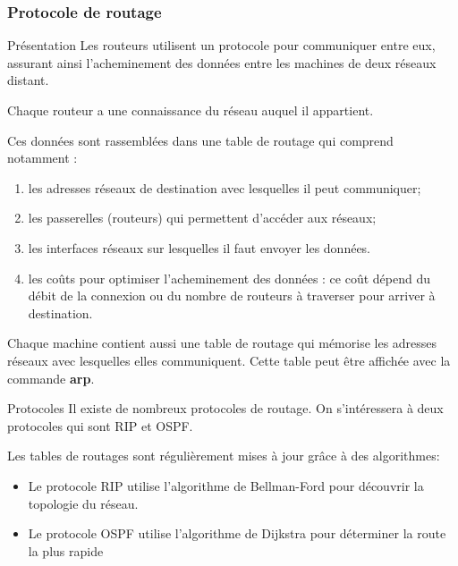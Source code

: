 \documentclass[8pt]{beamer}
\begin{document}
\begin{frame}
\frametitle{Protocole de routage}


\begin{block}{Présentation}
Les routeurs utilisent un protocole pour communiquer entre eux, assurant ainsi l'acheminement des données entre les machines de deux réseaux distant.

Chaque routeur a une connaissance du réseau auquel il appartient. 

Ces données sont rassemblées dans une table de routage qui comprend notamment :
\begin{enumerate}
\item les adresses réseaux de destination avec lesquelles il peut communiquer;
\item les passerelles (routeurs) qui permettent d'accéder aux réseaux;
\item les interfaces réseaux sur lesquelles il faut envoyer les données.
\item les coûts pour optimiser l'acheminement des données : ce coût dépend du débit de la connexion ou du nombre de routeurs à traverser pour arriver à destination.
\end{enumerate}

Chaque machine contient aussi une table de routage qui mémorise les adresses réseaux avec lesquelles elles communiquent. Cette table peut être affichée avec la commande \textbf{arp}.
\end{block}

\begin{block}{Protocoles}
Il existe de nombreux protocoles de routage. On s'intéressera à deux protocoles qui sont RIP et OSPF.\smallskip

Les tables de routages sont régulièrement mises à jour grâce à des algorithmes:
\begin{itemize}
\item Le protocole RIP utilise l'algorithme de Bellman-Ford pour découvrir la topologie du réseau.
\item Le protocole OSPF utilise l'algorithme de Dijkstra pour déterminer la route la plus rapide
\end{itemize}
\end{block}

\end{frame}
\end{document}
